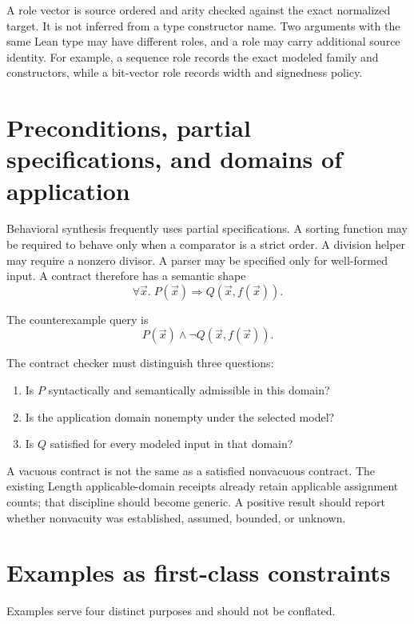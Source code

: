 \documentclass[11pt,oneside]{report}
\begin{document}
A role vector is source ordered and arity checked against the exact normalized target. It is not inferred from a type constructor name. Two arguments with the same Lean type may have different roles, and a role may carry additional source identity. For example, a sequence role records the exact modeled family and constructors, while a bit-vector role records width and signedness policy.

\section{Preconditions, partial specifications, and domains of application}

Behavioral synthesis frequently uses partial specifications. A sorting function may be required to behave only when a comparator is a strict order. A division helper may require a nonzero divisor. A parser may be specified only for well-formed input. A contract therefore has a semantic shape
\[
  \forall \vec{x}.\; P(\vec{x}) \Longrightarrow Q(\vec{x}, f(\vec{x})).
\]

The counterexample query is
\[
  P(\vec{x}) \land \neg Q(\vec{x}, f(\vec{x})).
\]

The contract checker must distinguish three questions:

\begin{enumerate}[leftmargin=2em]
\item Is $P$ syntactically and semantically admissible in this domain?
\item Is the application domain nonempty under the selected model?
\item Is $Q$ satisfied for every modeled input in that domain?
\end{enumerate}

A vacuous contract is not the same as a satisfied nonvacuous contract. The existing Length applicable-domain receipts already retain applicable assignment counts; that discipline should become generic. A positive result should report whether nonvacuity was established, assumed, bounded, or unknown.

\section{Examples as first-class constraints}

Examples serve four distinct purposes and should not be conflated.
\end{document}
